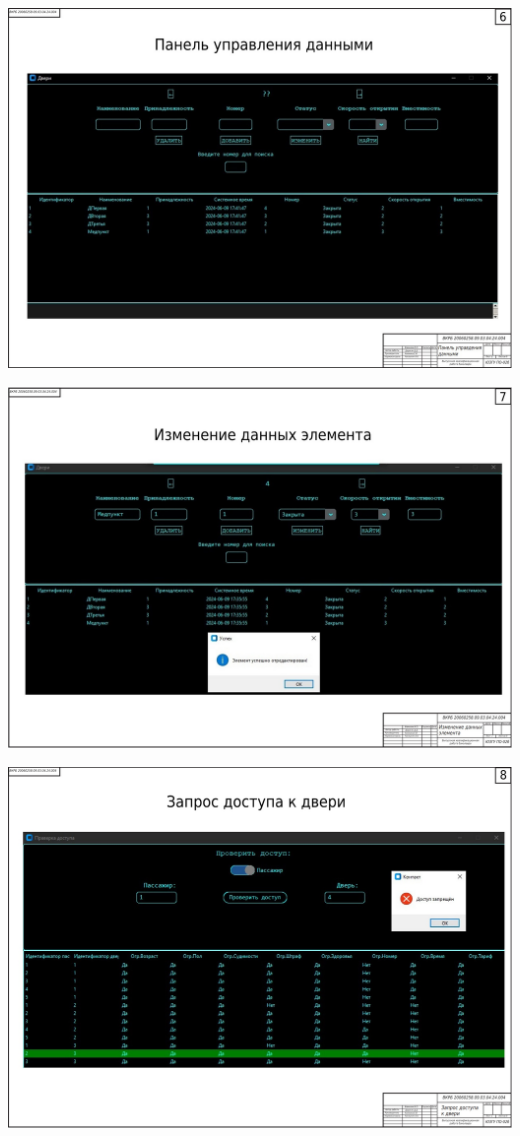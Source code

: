 \begin{landscape}
\begin{плакат}
	\includegraphics[width=0.82\linewidth]{images/плакат6}
	\label{fig:6}
\end{плакат}

\begin{плакат}
	\centering
	\includegraphics[width=0.82\linewidth]{images/плакат7}
	\label{fig:7}
\end{плакат}

\begin{плакат}
	\centering
	\includegraphics[width=0.82\linewidth]{images/плакат8}
	\label{fig:8}
\end{плакат}


\end{landscape}
